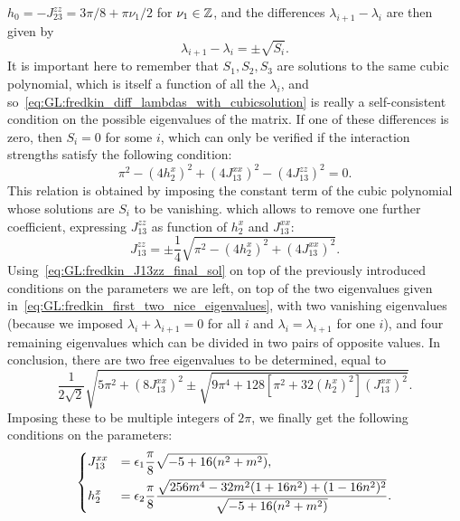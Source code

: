 $h_0=-J_{23}^{zz}=3\pi/8+\pi \nu_1/2$ for $\nu_1\in{\mathbb{Z}}$, and the differences $\lambda_{i+1}-\lambda_i$ are then given by
\begin{equation}
    \lambda_{i+1} - \lambda_i = \pm \sqrt{S_i}.
    \label{eq:GL:fredkin_diff_lambdas_with_cubicsolution}
\end{equation}
It is important here to remember that $S_1, S_2, S_3$ are solutions to the same cubic polynomial, which is itself a function of all the $\lambda_i$, and so~\cref{eq:GL:fredkin_diff_lambdas_with_cubicsolution} is really a self-consistent condition on the possible eigenvalues of the matrix.
If one of these differences is zero, then $S_i=0$ for some $i$, which can only be verified if the interaction strengths satisfy the following condition:
\begin{equation}
    \pi^2
    - (4h_2^x)^2
    + (4 J_{13}^{xx})^2
    - (4 J_{13}^{zz})^2 = 0.
\end{equation}
This relation is obtained by imposing the constant term of the cubic polynomial whose solutions are $S_i$ to be vanishing.
which allows to remove one further coefficient, expressing $J_{13}^{zz}$ as function of $h_2^x$ and $J_{13}^{xx}$:
\begin{equation}
    J_{13}^{zz} = \pm\frac{1}{4}\sqrt{
        \pi^2 - (4 h_2^x)^2 + (4 J_{13}^{xx})^2
    }.
    \label{eq:GL:fredkin_J13zz_final_sol}
\end{equation}
Using~\cref{eq:GL:fredkin_J13zz_final_sol} on top of the previously introduced conditions on the parameters we are left, on top of the two eigenvalues given in~\cref{eq:GL:fredkin_first_two_nice_eigenvalues}, with two vanishing eigenvalues (because we imposed $\lambda_i+\lambda_{i+1}=0$ for all $i$ and $\lambda_i=\lambda_{i+1}$ for one $i$), and four remaining eigenvalues which can be divided in two pairs of opposite values.
In conclusion, there are two free eigenvalues to be determined, equal to
\begin{equation}
    \frac{1}{2\sqrt2}
    \sqrt{
        5\pi^2 + (8 J_{13}^{xx})^2
        \pm
        \sqrt{
            9\pi^4 + 128[\pi^2 + 32 (h_2^x)^2] (J_{13}^{xx})^2
        }
    }.
\end{equation}
Imposing these to be multiple integers of $2\pi$, we finally get the following conditions on the parameters:
\begin{equation}
\begin{dcases}%
    J_{13}^{xx} &= \epsilon_1\frac{\pi}{8}\sqrt{-5+16(n^2+m^2)}, \\
    h_2^x       &= \epsilon_2\frac{\pi}{8} \frac{
        \sqrt{256 m^4 - 32 m^2 (1 + 16n^2) + (1 - 16 n^2)^2}
    }{
        \sqrt{-5+16(n^2+m^2)}
    }.
\end{dcases}
\end{equation}
